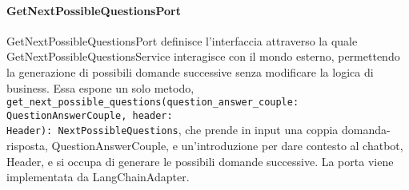 \paragraph{GetNextPossibleQuestionsPort}
\label{sec:get_next_possible_questions_port}
GetNextPossibleQuestionsPort definisce l'interfaccia attraverso la quale GetNextPossibleQuestionsService interagisce con il mondo esterno, permettendo la generazione di possibili domande successive senza modificare la logica di business. Essa espone un solo metodo, \texttt{get\_next\_possible\_questions(question\_answer\_couple: QuestionAnswerCouple, header:\\ Header): NextPossibleQuestions}, che prende in input una coppia domanda-risposta, QuestionAnswerCouple, e un'introduzione per dare contesto al chatbot, Header, e si occupa di generare le possibili domande successive. La porta viene implementata da LangChainAdapter.

\newpage


\label{sec:adapter}

